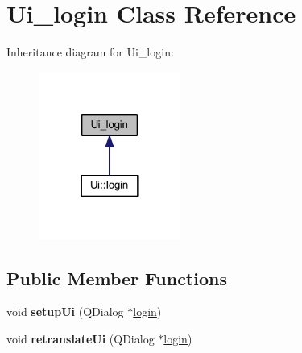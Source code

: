 \hypertarget{class_ui__login}{}\section{Ui\+\_\+login Class Reference}
\label{class_ui__login}


Inheritance diagram for Ui\+\_\+login\+:
\nopagebreak
\begin{figure}[H]
\begin{center}
\leavevmode
\includegraphics[width=132pt]{class_ui__login__inherit__graph}
\end{center}
\end{figure}
\subsection*{Public Member Functions}
\begin{DoxyCompactItemize}
\item 
\mbox{\label{class_ui__login_a20807779cb4de233ae2be21daccf4e77}} 
void {\bfseries setup\+Ui} (Q\+Dialog $\ast$\mbox{\hyperlink{classlogin}{login}})
\item 
\mbox{\label{class_ui__login_ab9fc8edafc04ce1be3b383c6db911713}} 
void {\bfseries retranslate\+Ui} (Q\+Dialog $\ast$\mbox{\hyperlink{classlogin}{login}})
\end{DoxyCompactItemize}
